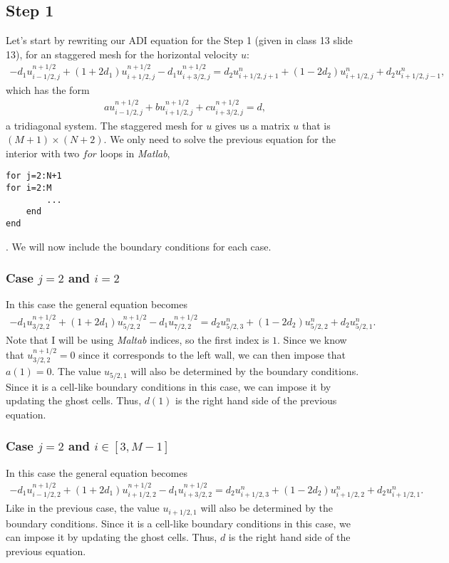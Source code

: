 \subsection{Step 1}
Let's start by rewriting our ADI equation for the Step 1 (given in class 13 slide 13), for an staggered mesh for the horizontal velocity $u$:
\begin{align*}
-d_1u_{i-1/2,j}^{n+1/2}+(1+2d_1)u_{i+1/2,j}^{n+1/2}-d_1u_{i+3/2,j}^{n+1/2}=d_2u_{i+1/2,j+1}^{n}+(1-2d_2)u_{i+1/2,j}^{n}+d_2u_{i+1/2,j-1}^{n},
\end{align*}
which has the form 
\begin{align*}
au_{i-1/2,j}^{n+1/2}+bu_{i+1/2,j}^{n+1/2}+cu_{i+3/2,j}^{n+1/2}=d,
\end{align*}
a tridiagonal system. The staggered mesh for $u$ gives us a matrix $u$ that is $(M+1)\times(N+2)$. We only need to solve the previous equation for the interior with two $for$ loops in \textsl{Matlab},
\begin{verbatim}
for j=2:N+1
for i=2:M
		...
	end
end
\end{verbatim}.
We will now include the boundary conditions for each case.
\subsubsection*{Case $j=2$ and $i=2$}
In this case the general equation becomes
\begin{align*}
-d_1u_{3/2,2}^{n+1/2}+(1+2d_1)u_{5/2,2}^{n+1/2}-d_1u_{7/2,2}^{n+1/2}=d_2u_{5/2,3}^{n}+(1-2d_2)u_{5/2,2}^{n}+d_2u_{5/2,1}^{n}.
\end{align*}
Note that I will be using \textsl{Maltab} indices, so the first index is $1$. Since we know that $u_{3/2,2}^{n+1/2}=0$ since it corresponds to the left wall, we can then impose that $a(1)=0$. The value $u_{5/2,1}$ will also be determined by the boundary conditions. Since it is a cell-like boundary conditions in this case, we can impose it by updating the ghost cells. Thus, $d(1)$ is the right hand side of the previous equation.

\subsubsection*{Case $j=2$ and $i\in [3,M-1]$}
In this case the general equation becomes
\begin{align*}
-d_1u_{i-1/2,2}^{n+1/2}+(1+2d_1)u_{i+1/2,2}^{n+1/2}-d_1u_{i+3/2,2}^{n+1/2}=d_2u_{i+1/2,3}^{n}+(1-2d_2)u_{i+1/2,2}^{n}+d_2u_{i+1/2,1}^{n}.
\end{align*}
Like in the previous case, the value $u_{i+1/2,1}$ will also be determined by the boundary conditions. Since it is a cell-like boundary conditions in this case, we can impose it by updating the ghost cells. Thus, $d$ is the right hand side of the previous equation.

